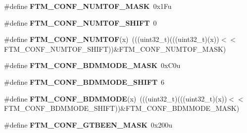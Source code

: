 \begin{DoxyCompactItemize}
\item 
\#define {\bfseries F\+T\+M\+\_\+\+C\+O\+N\+F\+\_\+\+N\+U\+M\+T\+O\+F\+\_\+\+M\+A\+SK}~0x1\+Fu\hypertarget{group__FTM__Register__Masks_gae8e95c8cac97f0cf6cec2edd277aaca3}{}\label{group__FTM__Register__Masks_gae8e95c8cac97f0cf6cec2edd277aaca3}

\item 
\#define {\bfseries F\+T\+M\+\_\+\+C\+O\+N\+F\+\_\+\+N\+U\+M\+T\+O\+F\+\_\+\+S\+H\+I\+FT}~0\hypertarget{group__FTM__Register__Masks_ga6ee8ba517c1d833d785fbe2fb0344726}{}\label{group__FTM__Register__Masks_ga6ee8ba517c1d833d785fbe2fb0344726}

\item 
\#define {\bfseries F\+T\+M\+\_\+\+C\+O\+N\+F\+\_\+\+N\+U\+M\+T\+OF}(x)~(((uint32\+\_\+t)(((uint32\+\_\+t)(x))$<$$<$F\+T\+M\+\_\+\+C\+O\+N\+F\+\_\+\+N\+U\+M\+T\+O\+F\+\_\+\+S\+H\+I\+FT))\&F\+T\+M\+\_\+\+C\+O\+N\+F\+\_\+\+N\+U\+M\+T\+O\+F\+\_\+\+M\+A\+SK)\hypertarget{group__FTM__Register__Masks_gaa084b68452f9be9a4f5231e046ff416e}{}\label{group__FTM__Register__Masks_gaa084b68452f9be9a4f5231e046ff416e}

\item 
\#define {\bfseries F\+T\+M\+\_\+\+C\+O\+N\+F\+\_\+\+B\+D\+M\+M\+O\+D\+E\+\_\+\+M\+A\+SK}~0x\+C0u\hypertarget{group__FTM__Register__Masks_ga832712efda712d40d626989b691a0647}{}\label{group__FTM__Register__Masks_ga832712efda712d40d626989b691a0647}

\item 
\#define {\bfseries F\+T\+M\+\_\+\+C\+O\+N\+F\+\_\+\+B\+D\+M\+M\+O\+D\+E\+\_\+\+S\+H\+I\+FT}~6\hypertarget{group__FTM__Register__Masks_gacb37f407e308d688a6bcb6a50d67730f}{}\label{group__FTM__Register__Masks_gacb37f407e308d688a6bcb6a50d67730f}

\item 
\#define {\bfseries F\+T\+M\+\_\+\+C\+O\+N\+F\+\_\+\+B\+D\+M\+M\+O\+DE}(x)~(((uint32\+\_\+t)(((uint32\+\_\+t)(x))$<$$<$F\+T\+M\+\_\+\+C\+O\+N\+F\+\_\+\+B\+D\+M\+M\+O\+D\+E\+\_\+\+S\+H\+I\+FT))\&F\+T\+M\+\_\+\+C\+O\+N\+F\+\_\+\+B\+D\+M\+M\+O\+D\+E\+\_\+\+M\+A\+SK)\hypertarget{group__FTM__Register__Masks_gac35551a6fb1df02d6a0d83b0ec4df82a}{}\label{group__FTM__Register__Masks_gac35551a6fb1df02d6a0d83b0ec4df82a}

\item 
\#define {\bfseries F\+T\+M\+\_\+\+C\+O\+N\+F\+\_\+\+G\+T\+B\+E\+E\+N\+\_\+\+M\+A\+SK}~0x200u\hypertarget{group__FTM__Register__Masks_ga2ab518e33ed4bcb533a022f469c62994}{}\label{group__FTM__Register__Masks_ga2ab518e33ed4bcb533a022f469c62994}


\end{DoxyCompactItemize}
